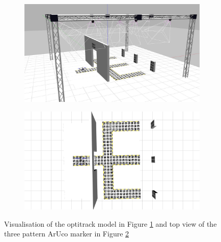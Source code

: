 \documentclass[../Head/report.tex]{subfiles}
\begin{document}
\begin{figure}[H]
    \centering
    \begin{subfigure}[t]{.48\textwidth}
        \centering
        \includegraphics[width=\textwidth]{../Figures/gazebo_three_pattern_view.jpg}
        \caption{}
        \label{fig:optitrack_three_pattern_aruco}
    \end{subfigure}
    \hfill
    \begin{subfigure}[t]{.48\textwidth}
        \centering
        \includegraphics[width=\textwidth]{../Figures/gazebo_three_pattern.jpg}
        \caption{}
        \label{fig:three_pattern_aruco}
    \end{subfigure}
    \caption{Visualisation of the optitrack model in Figure \ref{fig:optitrack_three_pattern_aruco} and top view of the three pattern ArUco marker in Figure \ref{fig:three_pattern_aruco}}
    \label{fig:two_pattern_aruco_fig}
\end{figure}
\end{document}
